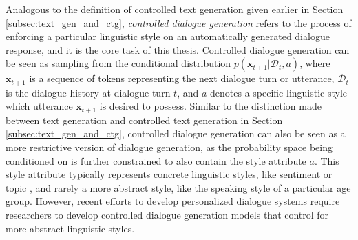 

Analogous to the definition of controlled text generation given earlier in Section \ref{subsec:text_gen_and_ctg}, \textit{controlled dialogue generation} refers to the process of enforcing a particular linguistic style on an automatically generated dialogue response, and it is the core task of this thesis. 
Controlled dialogue generation can be seen as sampling from the conditional distribution $p(\textbf{x}_{t + 1} | \mathcal{D}_t, a)$, where $\textbf{x}_{t + 1}$ is a sequence of tokens representing the next dialogue turn or utterance, $\mathcal{D}_t$ is the dialogue history at dialogue turn $t$, and $a$ denotes a specific linguistic style which utterance $\textbf{x}_{t + 1}$ is desired to possess. Similar to the distinction made between text generation and controlled text generation in Section \ref{subsec:text_gen_and_ctg}, controlled dialogue generation can also be seen as a more restrictive version of dialogue generation, as the probability space being conditioned on is further constrained to also contain the style attribute $a$. This style attribute typically represents concrete linguistic styles, like sentiment or topic \citep{madotto-etal-2020-plug}, and rarely a more abstract style, like the speaking style of a particular age group. However, recent efforts to develop personalized dialogue systems require researchers to develop controlled dialogue generation models that control for more abstract linguistic styles.




